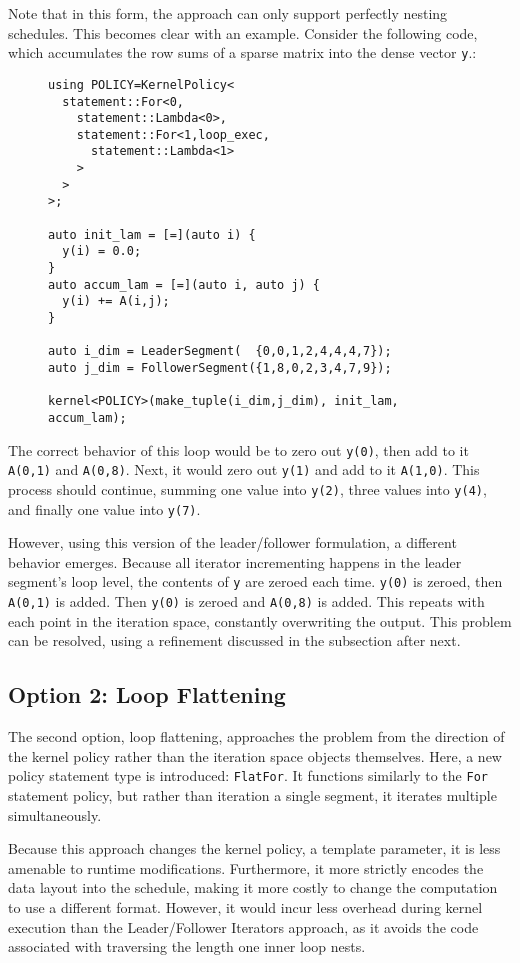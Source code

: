 Note that in this form, the approach can only support perfectly nesting schedules.
This becomes clear with an example.
Consider the following code, which accumulates the row sums of a sparse matrix into the dense vector \verb.y..:
\begin{figure}
\begin{lstlisting}
using POLICY=KernelPolicy<
  statement::For<0,
    statement::Lambda<0>,
    statement::For<1,loop_exec,
      statement::Lambda<1>
    >
  >
>;

auto init_lam = [=](auto i) {
  y(i) = 0.0;
}
auto accum_lam = [=](auto i, auto j) {
  y(i) += A(i,j);
}

auto i_dim = LeaderSegment(  {0,0,1,2,4,4,4,7});
auto j_dim = FollowerSegment({1,8,0,2,3,4,7,9});

kernel<POLICY>(make_tuple(i_dim,j_dim), init_lam, accum_lam);
\end{lstlisting}
\end{figure}
The correct behavior of this loop would be to zero out \verb.y(0)., then add to it \verb.A(0,1). and \verb.A(0,8)..
Next, it would zero out \verb.y(1). and add to it \verb.A(1,0)..
This process should continue, summing one value into \verb.y(2)., three values into \verb.y(4)., and finally one value into \verb.y(7)..

However, using this version of the leader/follower formulation, a different behavior emerges.
Because all iterator incrementing happens in the leader segment's loop level, the contents of \verb.y. are zeroed each time.
\verb.y(0). is zeroed, then \verb.A(0,1). is added.
Then \verb.y(0). is zeroed and \verb.A(0,8). is added.
This repeats with each point in the iteration space, constantly overwriting the output. 
This problem can be resolved, using a refinement discussed in the subsection after next.

\subsection{Option 2: Loop Flattening}

The second option, loop flattening, approaches the problem from the direction of the kernel policy rather than the iteration space objects themselves.
Here, a new policy statement type is introduced: \verb.FlatFor.. 
It functions similarly to the \verb.For. statement policy, but rather than iteration a single segment, it iterates multiple simultaneously. 

Because this approach changes the kernel policy, a template parameter, it is less amenable to runtime modifications. 
Furthermore, it more strictly encodes the data layout into the schedule, making it more costly to change the computation to use a different format.
However, it would incur less overhead during kernel execution than the Leader/Follower Iterators approach, as it avoids the code associated with traversing the length one inner loop nests.

